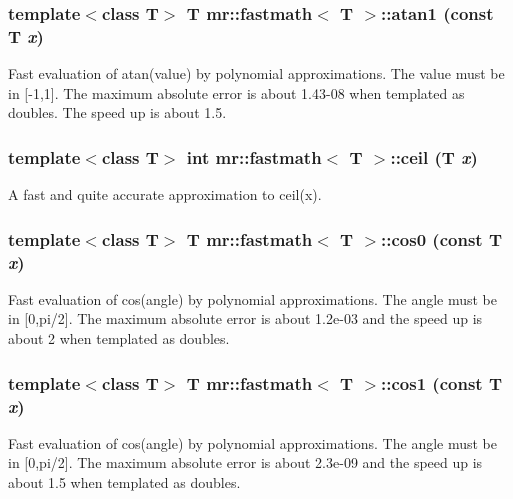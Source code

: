 \subsubsection{\setlength{\rightskip}{0pt plus 5cm}template$<$class T$>$ T {\bf mr::fastmath}$<$ T $>$::atan1 (const T {\em x})\hspace{0.3cm}{\tt  [inline, static]}}\label{classmr_1_1fastmath_e9}


Fast evaluation of atan(value) by polynomial approximations. The value must be in [-1,1]. The maximum absolute error is about 1.43-08 when templated as doubles. The speed up is about 1.5. 
\subsubsection{\setlength{\rightskip}{0pt plus 5cm}template$<$class T$>$ int {\bf mr::fastmath}$<$ T $>$::ceil (T {\em x})\hspace{0.3cm}{\tt  [inline, static]}}\label{classmr_1_1fastmath_e12}


A fast and quite accurate approximation to ceil(x). 

\subsubsection{\setlength{\rightskip}{0pt plus 5cm}template$<$class T$>$ T {\bf mr::fastmath}$<$ T $>$::cos0 (const T {\em x})\hspace{0.3cm}{\tt  [inline, static]}}\label{classmr_1_1fastmath_e2}


Fast evaluation of cos(angle) by polynomial approximations. The angle must be in [0,pi/2]. The maximum absolute error is about 1.2e-03 and the speed up is about 2 when templated as doubles. 
\subsubsection{\setlength{\rightskip}{0pt plus 5cm}template$<$class T$>$ T {\bf mr::fastmath}$<$ T $>$::cos1 (const T {\em x})\hspace{0.3cm}{\tt  [inline, static]}}\label{classmr_1_1fastmath_e3}


Fast evaluation of cos(angle) by polynomial approximations. The angle must be in [0,pi/2]. The maximum absolute error is about 2.3e-09 and the speed up is about 1.5 when templated as doubles. 
